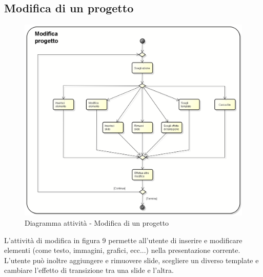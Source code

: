 \subsection{Modifica di un progetto}
\begin{figure}[h] 
	\centering 
	\includegraphics[scale=0.3] {img/Activity_modifica.png} 
	\caption{Diagramma attività - Modifica di un progetto} 
\end{figure}
L'attività di modifica in figura 9 permette all'utente di inserire e modificare elementi (come testo, immagini, grafici, ecc...) nella presentazione corrente. L'utente può inoltre aggiungere e rimuovere slide, scegliere un diverso template e cambiare l'effetto di transizione tra una slide e l'altra.
\newpage

